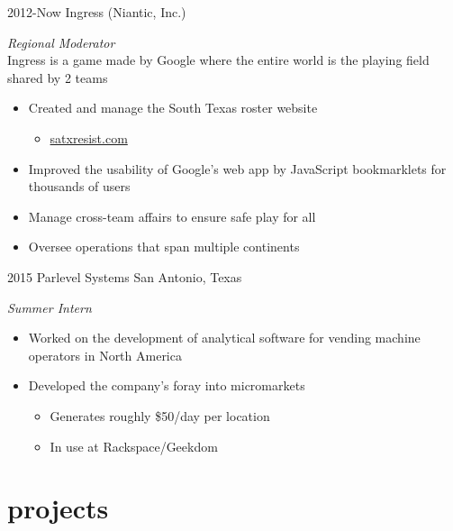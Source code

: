\documentclass[print]{friggeri-cv} %
\begin{document}
\begin{entrylist}
	
	\entry
	{2012-Now}
	{Ingress (Niantic, Inc.)}
	{}
	{\emph{Regional Moderator} \\ 
		Ingress is a game made by Google where the entire world is the playing field shared by 2 teams
		\begin{itemize}
			\item Created and manage the South Texas roster website
				\begin{itemize}
					\item \href{http://satxresist.com}{satxresist.com}
				\end{itemize}
			\item Improved the usability of Google's web app by JavaScript bookmarklets for thousands of users
			\item Manage cross-team affairs to ensure safe play for all
			\item Oversee operations that span multiple continents
		\end{itemize}
	}
		
		
	\entry
	{2015}
	{Parlevel Systems}
	{San Antonio, Texas}
	{\emph{Summer Intern}
		\begin{itemize}
			\item Worked on the development of analytical software for vending machine operators in North America
			\item Developed the company's foray into micromarkets
				\begin{itemize}
					\item Generates roughly \$50/day per location
					\item In use at Rackspace/Geekdom
				\end{itemize}
		\end{itemize}
	}
		
		
\end{entrylist}


\section{projects}
\end{document}
